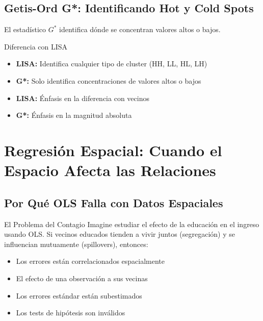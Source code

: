 \documentclass[12pt,a4paper]{article}
\begin{document}
\subsection{Getis-Ord G*: Identificando Hot y Cold Spots}

El estadístico $G^*$ identifica dónde se concentran valores altos o bajos.

\begin{conceptbox}{Diferencia con LISA}
\begin{itemize}
    \item \textbf{LISA:} Identifica cualquier tipo de cluster (HH, LL, HL, LH)
    \item \textbf{G*:} Solo identifica concentraciones de valores altos o bajos
    \item \textbf{LISA:} Énfasis en la diferencia con vecinos
    \item \textbf{G*:} Énfasis en la magnitud absoluta
\end{itemize}
\end{conceptbox}

\section{Regresión Espacial: Cuando el Espacio Afecta las Relaciones}

\subsection{Por Qué OLS Falla con Datos Espaciales}

\begin{ejemplo}{El Problema del Contagio}
Imagine estudiar el efecto de la educación en el ingreso usando OLS. Si vecinos educados tienden a vivir juntos (segregación) y se influencian mutuamente (spillovers), entonces:
\begin{itemize}
    \item Los errores están correlacionados espacialmente
    \item El efecto de una observación  a sus vecinas
    \item Los errores estándar están subestimados
    \item Los tests de hipótesis son inválidos
\end{itemize}
\end{ejemplo}
\end{document}
